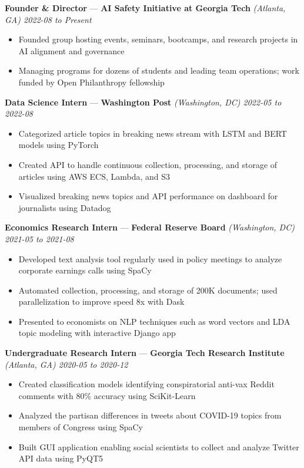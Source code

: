 \documentclass[10pt]{article}
\newcommand{\resumeSubHeading}[5]{
    \vspace*{5pt}
    \textbf{#1} — \textbf{#2} \textsl{(#3) \hfill #4 to #5}
}
\begin{document}
\resumeSubHeading
    {Founder \& Director}
    {AI Safety Initiative at Georgia Tech}
    {Atlanta, GA}
    {2022-08}
    {Present}
\begin{itemize}
    \item Founded group hosting events, seminars, bootcamps, and research projects in AI alignment and governance
    \item Managing programs for dozens of students and leading team operations; work funded by Open Philanthropy fellowship
\end{itemize}

\resumeSubHeading
    {Data Science Intern}
    {Washington Post}
    {Washington, DC}
    {2022-05}
    {2022-08}
\begin{itemize}
    \item Categorized article topics in breaking news stream with LSTM and BERT models using PyTorch
    \item Created API to handle continuous collection, processing, and storage of articles using AWS ECS, Lambda, and S3
    \item Visualized breaking news topics and API performance on dashboard for journalists using Datadog
\end{itemize}

\resumeSubHeading
    {Economics Research Intern}
    {Federal Reserve Board}
    {Washington, DC}
    {2021-05}
    {2021-08}
\begin{itemize}
    \item Developed text analysis tool regularly used in policy meetings to analyze corporate earnings calls using SpaCy
    \item Automated collection, processing, and storage of 200K documents; used parallelization to improve speed 8x with Dask
    \item Presented to economists on NLP techniques such as word vectors and LDA topic modeling with interactive Django app
\end{itemize}

\resumeSubHeading
    {Undergraduate Research Intern}
    {Georgia Tech Research Institute}
    {Atlanta, GA}
    {2020-05}
    {2020-12}
\begin{itemize}
    \item Created classification models identifying conspiratorial anti-vax Reddit comments with 80\% accuracy using SciKit-Learn
    \item Analyzed the partisan differences in tweets about COVID-19 topics from members of Congress using SpaCy
    \item Built GUI application enabling social scientists to collect and analyze Twitter API data using PyQT5
\end{itemize}
\end{document}
